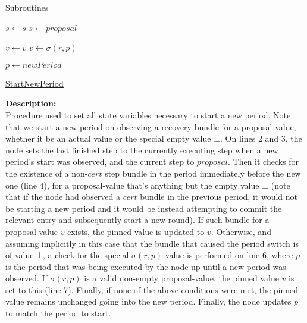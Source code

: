 \documentclass[10pt,a4paper]{article}
\begin{document}
\begin{section}{Subroutines}

\begin{algorithm}[H]\label{algo:start-new-period}
    \begin{algorithmic}[1]

    \State $\bar{s} \gets s$
    \State $s \gets proposal$

        \State $\bar{v} \gets v$
        \State $\bar{v} \gets \sigma(r,p)$
    \EndIf

    \State $p \gets newPeriod$

    \EndFunction
    \end{algorithmic}
    \caption{\underline{StartNewPeriod}}
\end{algorithm}

\noindent \textbf{Description:}\\
Procedure used to set all state variables necessary to start a new period.
Note that we start a new period on observing a recovery bundle for a proposal-value, whether it be
an actual value or the special empty value $\bot$.
On lines 2 and 3, the node sets the last finished step to the currently executing step when a new period's
start was observed, and the current step to $proposal$.
Then it checks for the existence of a non-$cert$ step bundle in the period immediately before the new one (line 4), 
for a proposal-value that's anything but the empty value $\bot$ (note that if the node had observed a $cert$
bundle in the previous period, it would not be starting a new period and it would be instead attempting to commit
the relevant entry and subsequently start a new round). If such bundle for a proposal-value $v$ exists, the pinned 
value is updated to $v$.
Otherwise, and assuming implicitly in this case that the bundle that caused the period switch is of value $\bot$,
a check for the special $\sigma(r,p)$ value is performed on line 6, where $p$ is the period that was being executed 
by the node up until a new period was observed. If $\sigma(r,p)$ is a valid non-empty proposal-value, the pinned 
value $\bar{v}$ is set to this (line 7).
Finally, if none of the above conditions were met, the pinned value remains unchanged going into the new period.
Finally, the node updates $p$ to match the period to start.


\end{section}
\end{document}
